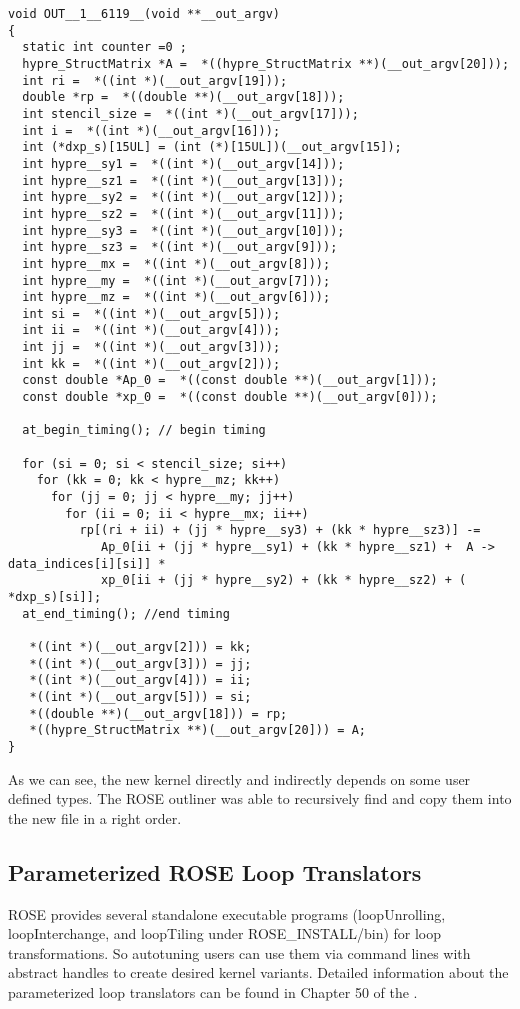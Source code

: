 \begin{lstlisting}
void OUT__1__6119__(void **__out_argv)
{
  static int counter =0 ;
  hypre_StructMatrix *A =  *((hypre_StructMatrix **)(__out_argv[20]));
  int ri =  *((int *)(__out_argv[19]));
  double *rp =  *((double **)(__out_argv[18]));
  int stencil_size =  *((int *)(__out_argv[17]));
  int i =  *((int *)(__out_argv[16]));
  int (*dxp_s)[15UL] = (int (*)[15UL])(__out_argv[15]);
  int hypre__sy1 =  *((int *)(__out_argv[14]));
  int hypre__sz1 =  *((int *)(__out_argv[13]));
  int hypre__sy2 =  *((int *)(__out_argv[12]));
  int hypre__sz2 =  *((int *)(__out_argv[11]));
  int hypre__sy3 =  *((int *)(__out_argv[10]));
  int hypre__sz3 =  *((int *)(__out_argv[9]));
  int hypre__mx =  *((int *)(__out_argv[8]));
  int hypre__my =  *((int *)(__out_argv[7]));
  int hypre__mz =  *((int *)(__out_argv[6]));
  int si =  *((int *)(__out_argv[5]));
  int ii =  *((int *)(__out_argv[4]));
  int jj =  *((int *)(__out_argv[3]));
  int kk =  *((int *)(__out_argv[2]));
  const double *Ap_0 =  *((const double **)(__out_argv[1]));
  const double *xp_0 =  *((const double **)(__out_argv[0]));

  at_begin_timing(); // begin timing

  for (si = 0; si < stencil_size; si++)
    for (kk = 0; kk < hypre__mz; kk++)
      for (jj = 0; jj < hypre__my; jj++)
        for (ii = 0; ii < hypre__mx; ii++)
          rp[(ri + ii) + (jj * hypre__sy3) + (kk * hypre__sz3)] -= 
             Ap_0[ii + (jj * hypre__sy1) + (kk * hypre__sz1) +  A -> data_indices[i][si]] *
             xp_0[ii + (jj * hypre__sy2) + (kk * hypre__sz2) + ( *dxp_s)[si]];
  at_end_timing(); //end timing

   *((int *)(__out_argv[2])) = kk;
   *((int *)(__out_argv[3])) = jj;
   *((int *)(__out_argv[4])) = ii;
   *((int *)(__out_argv[5])) = si;
   *((double **)(__out_argv[18])) = rp;
   *((hypre_StructMatrix **)(__out_argv[20])) = A;
}

\end{lstlisting}

As we can see, the new kernel directly and indirectly depends on some user defined types. 
The ROSE outliner was able to recursively find and copy them into the new
file in a right order.
\subsection{Parameterized ROSE Loop Translators}
ROSE provides several standalone executable programs
(loopUnrolling, loopInterchange, and loopTiling under ROSE\_INSTALL/bin) for loop
transformations.
So autotuning users can use them via command
lines with abstract handles to create desired kernel variants.
Detailed information about the parameterized loop translators can be found
in Chapter 50 of the .


